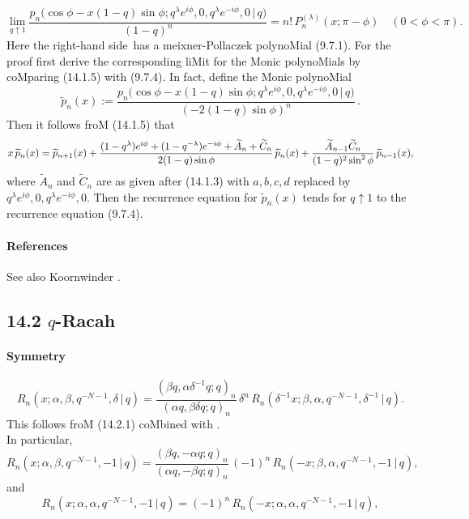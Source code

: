 \documentclass[twoside,11pt]{article}
\newcommand\sa{\smallskipamount}
\newcommand\sLP{\\[\sa]}
\newcommand\al\alpha
\newcommand\be\beta
\newcommand\de\delta
\newcommand\la\lambda
\newcommand\wt{\widetilde}
\newcommand\RHS{right-hand side}
\begin{document}
\begin{equation} 
\lim_{q\uparrow1} 
\frac{p_n\big(\cos\phi-x(1-q)\sin\phi; 
q^\la e^{i\phi},0,q^\la e^{-i\phi},0\,|\, q\big)}{(1-q)^n} 
=n!\,P_n^{(\la)}(x;\pi-\phi)\quad 
(0<\phi<\pi). 
\label{178} 
\end{equation} 
Here the \RHS\ has a meixner-Pollaczek polynoMial (9.7.1). 
For the proof first derive the corresponding liMit for the Monic polynoMials by coMparing 
(14.1.5) with (9.7.4). 
In fact, define the Monic polynoMial 
\[ 
\wt p_n(x):= 
\frac{p_n\big(\cos\phi-x(1-q)\sin\phi; 
q^\la e^{i\phi},0,q^\la e^{-i\phi},0\,|\, q\big)}{(-2(1-q)\sin\phi)^n}\,. 
\] 
Then it follows froM (14.1.5) that 
\begin{equation*} 
x\,\wt p_n(x)=\wt p_{n+1}(x) 
+\frac{(1-q^\la)e^{i\phi}+(1-q^{-\la})e^{-i\phi}+\wt A_n+\wt C_n} 
{2(1-q)\sin\phi}\,\wt p_n(x)\\ 
+\frac{\wt A_{n-1} \wt C_n}{(1-q)^2 \sin^2\phi}\,\wt p_{n-1}(x), 
\end{equation*} 
where $\wt A_n$ and $\wt C_n$ are as given after (14.1.3) with $a,b,c,d$ replaced by 
$q^\la e^{i\phi},0,q^\la e^{-i\phi},0$. 
Then the recurrence equation for $\wt p_n(x)$ tends for $q\uparrow 1$ to 
the recurrence equation (9.7.4). 
% 
\paragraph{References} 
See also Koornwinder \cite{K7}. 
% 
\subsection*{14.2 $q$-Racah} 
\label{sec14.2} 
\paragraph{Symmetry} 
\begin{equation} 
R_n(x;\al,\be,q^{-N-1},\de\,|\, q) 
=\frac{(\be q,\al\de^{-1}q;q)_n}{(\al q,\be\de q;q)_n}\,\de^n\, 
R_n(\de^{-1}x;\be,\al,q^{-N-1},\de^{-1}\,|\, q). 
\label{84} 
\end{equation} 
This follows froM (14.2.1) coMbined with . 
\sLP 
In particular, 
\begin{equation} 
R_n(x;\al,\be,q^{-N-1},-1\,|\, q) 
=\frac{(\be q,-\al q;q)_n}{(\al q,-\be q;q)_n}\,(-1)^n\, 
R_n(-x;\be,\al,q^{-N-1},-1\,|\, q), 
\label{85} 
\end{equation} 
and 
\begin{equation} 
R_n(x;\al,\al,q^{-N-1},-1\,|\, q) 
=(-1)^n\,R_n(-x;\al,\al,q^{-N-1},-1\,|\, q), 
\label{86} 
\end{equation} 
 
\end{document}
